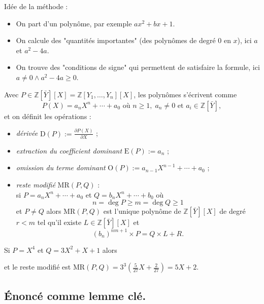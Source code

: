 \documentclass[./main]{subfiles}
\begin{document}
  Idée de la méthode :
  \begin{itemize}
    \item On part d'un polynôme, par exemple $a x^2 + b x + 1$.
    \item On calcule des "quantités importantes" (des polynômes de degré $0$ en $x$), ici $a$ et $a^2 - 4a$.
    \item On trouve des "conditions de signe" qui permettent de satisfaire la formule, ici $a \neq 0 \land a^2 - 4a \ge 0$.
  \end{itemize}

  \begin{defn}
    Avec $P \in \mathds{Z}[\bar{Y}][X] = \mathds{Z}[Y_1, \ldots, Y_n][X]$, les polynômes s'écrivent comme \[
      P(X) = a_n X^n + \cdots + a_0 \text{ où } n \ge 1, \; a_n \neq 0 \text{ et } a_i  \in \mathds{Z}[\bar{Y}]
    ,\]
    et on définit les opérations :
    \begin{itemize}
      \item \textit{dérivée} $\mathrm{D}(P) := \frac{\partial P(X)}{\partial X}$ ;
      \item \textit{extraction du coefficient dominant} $\mathrm{E}(P) := a_n$ ;
      \item \textit{omission du terme dominant} $\mathrm{O}(P) := a_{n-1} X^{n-1} + \cdots + a_0$ ;
      \item \textit{reste modifié} $\mathrm{MR}(P, Q)$ :\\
        si $P = a_n X^n + \cdots + a_0$ et $Q = b_n X^n + \cdots + b_0$ où
        \[ n = \deg P \ge m = \deg Q \ge 1\]
        et $P \neq Q$ alors $\mathrm{MR}(P, Q)$ est l'unique polynôme de $\mathds{Z}[\bar{Y}][X]$ de degré $r < m$ tel qu'il existe $L \in \mathds{Z}[\bar{Y}][X]$ et 
        \[
          (b_n)^{n m + 1} \times P = Q \times L + R
        .\]
    \end{itemize}
  \end{defn}

  \begin{exm}
    Si $P = X^4$ et $Q = 3X^2 + X + 1$ alors 
    \begin{center}
    \end{center}
    et le reste modifié est $\mathrm{MR}(P, Q) = 3^3(\frac{5}{27} X + \frac{2}{27}) = 5X + 2$.
  \end{exm}

  \subsection{Énoncé comme lemme clé.}
\end{document}
